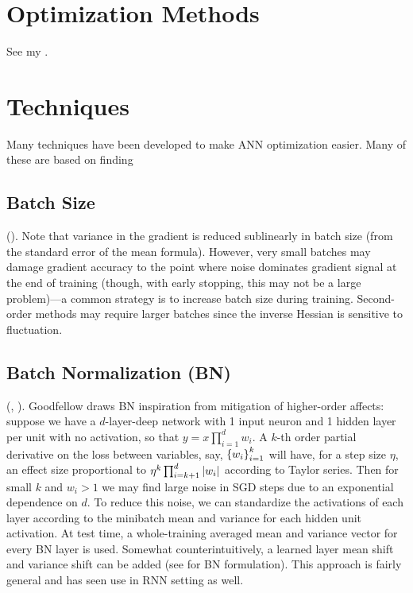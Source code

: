 \documentclass{article}
\begin{document}
\section{Optimization Methods}

See my .

\section{Techniques}

Many techniques have been developed to make ANN optimization easier. Many of these are based on finding 

\subsection{Batch Size}

(). Note that variance in the gradient is reduced sublinearly in batch size (from the standard error of the mean formula). However, very small batches may damage gradient accuracy to the point where noise dominates gradient signal at the end of training (though, with early stopping, this may not be a large problem)---a common strategy is to increase batch size during training. Second-order methods may require larger batches since the inverse Hessian is sensitive to fluctuation.

\subsection{Batch Normalization (BN)}

(, ). Goodfellow draws BN inspiration from mitigation of higher-order affects: suppose we have a $d$-layer-deep network with 1 input neuron and 1 hidden layer per unit with no activation, so that $y=x\prod_{i=1}^dw_i$. A $k$-th order partial derivative on the loss between variables, say, $\left\{{w_i}\right\}_{i=1}^k$ will have, for a step size $\eta$, an effect size proportional to $\eta^k\prod_{i=k + 1}^{d}\left|{w_i}\right|$ according to Taylor series. Then for small $k$ and $w_i>1$ we may find large noise in SGD steps due to an exponential dependence on $d$. To reduce this noise, we can standardize the activations of each layer according to the minibatch mean and variance for each hidden unit activation. At test time, a whole-training averaged mean and variance vector for every BN layer is used. Somewhat counterintuitively, a learned layer mean shift and variance shift can be added (see  for BN formulation). This approach is fairly general and has seen use in RNN setting as well.
\end{document}
